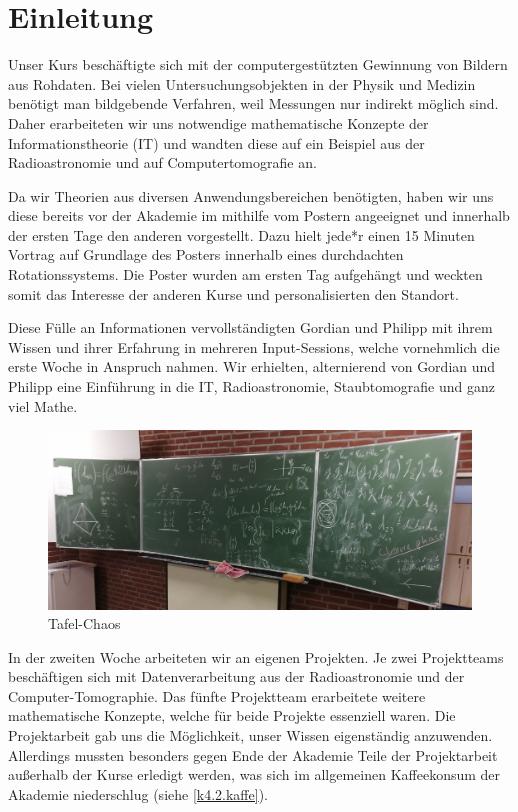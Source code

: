 \section{Einleitung}

Unser Kurs beschäftigte sich mit der computergestützten Gewinnung von Bildern aus Rohdaten. Bei vielen Untersuchungsobjekten in der Physik und Medizin benötigt man bildgebende Verfahren, weil Messungen nur indirekt möglich sind. Daher erarbeiteten wir uns notwendige mathematische Konzepte der Informationstheorie (IT) und wandten diese auf ein Beispiel aus der Radioastronomie und auf Computertomografie an.

Da wir Theorien aus diversen Anwendungsbereichen benötigten, haben wir uns diese bereits vor der Akademie im mithilfe vom Postern angeeignet und innerhalb der ersten Tage den anderen vorgestellt. Dazu hielt jede*r einen 15 Minuten Vortrag auf Grundlage des Posters innerhalb eines durchdachten Rotationssystems. Die Poster wurden am ersten Tag aufgehängt und weckten somit das Interesse der anderen Kurse und personalisierten den Standort.

Diese Fülle an Informationen vervollständigten Gordian und Philipp mit ihrem Wissen und ihrer Erfahrung in mehreren Input-Sessions, welche vornehmlich die erste Woche in Anspruch nahmen. Wir erhielten, alternierend von Gordian und Philipp eine Einführung in die IT, Radioastronomie, Staubtomografie und ganz viel Mathe.

\begin{figure}[htb]
    \centering
    \includegraphics{k4.2/tafelbild.png}
    \caption{Tafel-Chaos}
\end{figure}


In der zweiten Woche arbeiteten wir an eigenen Projekten. Je zwei Projektteams beschäftigen sich mit Datenverarbeitung aus der Radioastronomie und der Computer-Tomographie. Das fünfte Projektteam erarbeitete weitere mathematische Konzepte, welche für beide Projekte essenziell waren. Die Projektarbeit gab uns die Möglichkeit, unser Wissen eigenständig anzuwenden. Allerdings mussten besonders gegen Ende der Akademie Teile der Projektarbeit außerhalb der Kurse erledigt werden, was sich im allgemeinen Kaffeekonsum der Akademie niederschlug (siehe \cref{k4.2.kaffe}).

